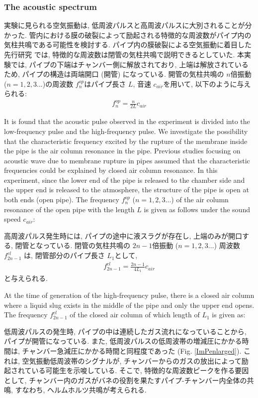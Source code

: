 \documentclass[12pt]{article}
\begin{document}
\subsubsection{The acoustic spectrum}
実験に見られる空気振動は, 低周波パルスと高周波パルスに大別されることが分かった. 
管内における膜の破裂によって励起される特徴的な周波数がパイプ内の気柱共鳴である可能性を検討する. 
パイプ内の膜破裂による空気振動に着目した先行研究 \citep{Vidal2006a, Sanchez2014} では, 特徴的な周波数は閉管の気柱共鳴で説明できるとしていた. 
本実験では, パイプの下端はチャンバー側に解放されており, 上端は解放されているため, パイプの構造は両端開口 (開管) になっている. 
開管の気柱共鳴の $n$倍振動 ($n=1,2,3...$)の周波数 $f^{op}_{n}$はパイプ長さ $L$, 音速 $c_{air}$を用いて, 以下のように与えられる:
\begin{eqnarray}
f^{op}_{n}=\frac{n}{2L} c_{air}
\end{eqnarray}

It is found that the acoustic pulse observed in the experiment is divided into the low-frequency pulse and the high-frequency pulse.
We investigate the possibility that the characteristic frequency excited by the rupture of the membrane inside the pipe is the air column resonance in the pipe.
Previous studies focusing on acoustic wave due to membrane rupture in pipes \citep{Vidal 2006a, Sanchez2014} assumed that the characteristic frequencies could be explained by closed air column resonance.
In this experiment, since the lower end of the pipe is released to the chamber side and the upper end is released to the atmosphere, the structure of the pipe is open at both ends (open pipe).
The frequency $ f^{op}_{n}$ ($ n = 1, 2, 3 ... $) of the air column resonance of the open pipe with the length $L$ is given as follows under the sound speed $c_{air}$:

高周波パルス発生時には, パイプの途中に液スラグが存在し, 上端のみが開口する, 閉管となっている. 
閉管の気柱共鳴の $2n-1$倍振動 ($n=1,2,3...$) 周波数 $f^{cl}_{2n-1}$ は, 閉管部分のパイプ長さ $L_1$として, 
\begin{eqnarray}
f^{cl}_{2n-1}=\frac{2n-1}{4L_1} c_{air}
\end{eqnarray}
と与えられる.

At the time of generation of the high-frequency pulse, there is a closed air column where a liquid slug exists in the middle of the pipe and only the upper end opens.
The frequency $f^{cl}_{2n-1}$ of the closed air column of which length of $L_1$ is given as:

低周波パルスの発生時, パイプの中は連続したガス流れになっていることから, パイプが開管になっている.
また, 低周波パルスの低周波帯の増減圧にかかる時間は, チャンバー急減圧にかかる時間と同程度であった (Fig. \ref{ImPenlarged}). 
これは, 空気振動低周波帯のシグナルが, チャンバーからのガスの放出によって励起されている可能生を示唆している. 
そこで, 特徴的な周波数ピークを作る要因として, チャンバー内のガスがバネの役割を果たすパイプ-チャンバー内全体の共鳴, すなわち, ヘルムホルツ共鳴が考えられる.
\end{document}
